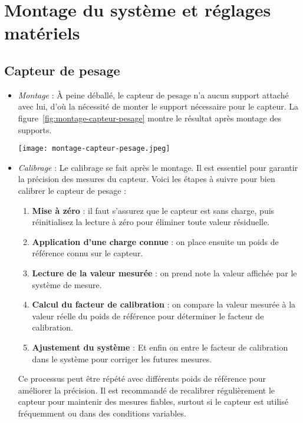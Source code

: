 \section{Montage du système et réglages matériels}
\subsection{Capteur de pesage}
\begin{itemize}
	\item \textit{Montage} : À peine déballé, le capteur de pesage n'a aucun support attaché avec lui, d'où la nécessité de monter le support nécessaire pour le capteur. La figure~\ref{fig:montage-capteur-pesage} montre le résultat après montage des supports.
	
	\begin{minipage}{\linewidth}
  		\centering
  		\texttt{[image: montage-capteur-pesage.jpeg]}
  		\label{fig:montage-capteur-pesage}
	\end{minipage}
	
	\item \textit{Calibrage} : Le calibrage se fait après le montage. Il est essentiel pour garantir la précision des mesures du capteur. Voici les étapes à suivre pour bien calibrer le capteur de pesage :

	\begin{enumerate}
		\item \textbf{Mise à zéro} : il faut s'assurez que le capteur est sans charge, puis réinitialisez la lecture à zéro pour éliminer toute valeur résiduelle.
		\item \textbf{Application d'une charge connue} : on place ensuite un poids de référence connu sur le capteur.
		\item \textbf{Lecture de la valeur mesurée} : on prend note la valeur affichée par le système de mesure.
		\item \textbf{Calcul du facteur de calibration} : on compare la valeur mesurée à la valeur réelle du poids de référence pour déterminer le facteur de calibration.
		\item \textbf{Ajustement du système} : Et enfin on entre le facteur de calibration dans le système pour corriger les futures mesures.
	\end{enumerate}

	Ce processus peut être répété avec différents poids de référence pour améliorer la précision. Il est recommandé de recalibrer régulièrement le capteur pour maintenir des mesures fiables, surtout si le capteur est utilisé fréquemment ou dans des conditions variables.
\end{itemize}


